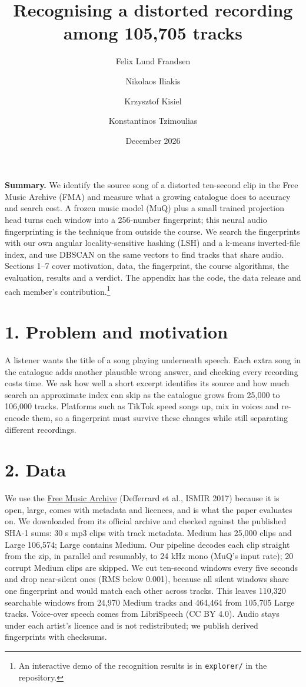 \documentclass[11pt,a4paper]{article}
\title{Recognising a distorted recording among 105,705 tracks}
\author{Felix Lund Frandsen \and Nikolaos Iliakis \and Krzysztof Kisiel \and Konstantinos Tzimoulias}
\date{December 2026}
\begin{document}
\maketitle

\textbf{Summary.} We identify the source song of a distorted ten-second clip in the Free Music Archive (FMA) and measure what a growing catalogue does to accuracy and search cost. A frozen music model (MuQ) plus a small trained projection head turns each window into a 256-number fingerprint; this neural audio fingerprinting is the technique from outside the course. We search the fingerprints with our own angular locality-sensitive hashing (LSH) and a k-means inverted-file index, and use DBSCAN on the same vectors to find tracks that share audio. Sections 1--7 cover motivation, data, the fingerprint, the course algorithms, the evaluation, results and a verdict. The appendix has the code, the data release and each member's contribution.\footnote{An interactive demo of the recognition results is in \texttt{explorer/} in the repository.}

\section*{1. Problem and motivation}
A listener wants the title of a song playing underneath speech. Each extra song in the catalogue adds another plausible wrong answer, and checking every recording costs time. We ask how well a short excerpt identifies its source and how much search an approximate index can skip as the catalogue grows from 25,000 to 106,000 tracks. Platforms such as TikTok speed songs up, mix in voices and re-encode them, so a fingerprint must survive these changes while still separating different recordings.

\section*{2. Data}
We use the \href{https://github.com/mdeff/fma}{Free Music Archive} (Defferrard et al., ISMIR 2017) because it is open, large, comes with metadata and licences, and is what the paper evaluates on. We downloaded from its official archive and checked against the published SHA-1 sums: 30 s mp3 clips with track metadata. Medium has 25,000 clips and Large 106,574; Large contains Medium. Our pipeline decodes each clip straight from the zip, in parallel and resumably, to 24 kHz mono (MuQ's input rate); 20 corrupt Medium clips are skipped. We cut ten-second windows every five seconds and drop near-silent ones (RMS below 0.001), because all silent windows share one fingerprint and would match each other across tracks. This leaves 110,320 searchable windows from 24,970 Medium tracks and 464,464 from 105,705 Large tracks. Voice-over speech comes from LibriSpeech (CC BY 4.0). Audio stays under each artist's licence and is not redistributed; we publish derived fingerprints with checksums.
\end{document}
